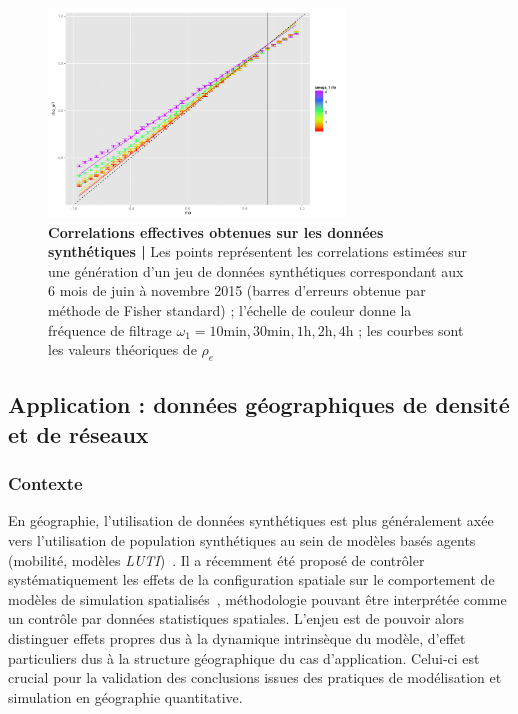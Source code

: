 \begin{figure}
\centering
\includegraphics[width=0.7\textwidth]{figures/effectiveCorrs_withGoodTh_A4}
\caption{\textbf{Correlations effectives obtenues sur les données synthétiques | } Les points représentent les correlations estimées sur une génération d'un jeu de données synthétiques correspondant aux 6 mois de juin à novembre 2015 (barres d'erreurs obtenue par méthode de Fisher standard) ; l'échelle de couleur donne la fréquence de filtrage $\omega_1=10\textrm{min},30\textrm{min},1\textrm{h},2\textrm{h},4\textrm{h}$ ; les courbes sont les valeurs théoriques de $\rho_e$}
\label{fig:effective_corrs}
\end{figure}


\begin{figure}

\caption{}
\label{fig:model_perf}
\end{figure}





\subsection{Application : données géographiques de densité et de réseaux}


\subsubsection{Contexte}


En géographie, l'utilisation de données synthétiques est plus généralement axée vers l'utilisation de population synthétiques au sein de modèles basés agents (mobilité, modèles \emph{LUTI})~\cite{pritchard2009advances}. Il a récemment été proposé de contrôler systématiquement les effets de la configuration spatiale sur le comportement de modèles de simulation spatialisés~\cite{cottineau2015revisiting}, méthodologie pouvant être interprétée comme un contrôle par données statistiques spatiales. L'enjeu est de pouvoir alors distinguer effets propres dus à la dynamique intrinsèque du modèle, d'effet particuliers dus à la structure géographique du cas d'application. Celui-ci est crucial pour la validation des conclusions issues des pratiques de modélisation et simulation en géographie quantitative.


